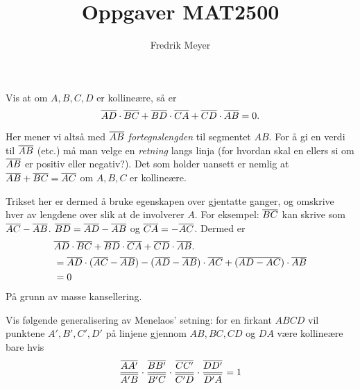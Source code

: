 \documentclass[11pt, norsk]{article}
\begin{document}
\title{Oppgaver MAT2500}
\author{Fredrik Meyer}
\maketitle 

\begin{oppg}
Vis at om $A,B,C,D$ er kollineære, så er 
\[
\overline{AD} \cdot \overline{BC}  + \overline{BD} \cdot \overline{CA} + \overline{CD} \cdot \overline{AB} = 0.
\]
\end{oppg}
\begin{losn}
 Her mener vi altså med $\overline{AB}$ \emph{fortegnslengden} til segmentet $AB$. For å gi en verdi til $\overline{AB}$ (etc.) må man velge en \emph{retning} langs linja (for hvordan skal en ellers si om $\overline{AB}$ er positiv eller negativ?). Det som holder uansett er nemlig at $\overline{AB} + \overline{BC} = \overline{AC}$ om $A,B,C$ er kollineære.

Trikset her er dermed å bruke egenskapen over gjentatte ganger, og omskrive hver av lengdene over slik at de involverer $A$. For eksempel: $\overline{BC}$ kan skrive som $\overline{AC}-\overline{AB}$. $\overline{BD} = \overline{AD}-\overline{AB}$ og $\overline{CA} = -\overline{AC}$. Dermed er
\begin{align*}
& \overline{AD} \cdot \overline{BC}  + \overline{BD} \cdot \overline{CA} + \overline{CD} \cdot \overline{AB}. \\
&= \overline{AD}\cdot (\overline{AC}-\overline{AB}) - (\overline{AD}-\overline{AB})\cdot \overline{AC} + (\overline{AD-AC}) \cdot \overline{AB} \\
&= 0
\end{align*}
På grunn av masse kansellering.
\end{losn}

\begin{oppg}
Vis følgende generalisering av Menelaos' setning: for en firkant $ABCD$ vil punktene $A',B',C',D'$ på linjene gjennom $AB, BC, CD$ og $DA$ være kollineære bare hvis 
$$
\frac{\overline{AA'}}{\overline{A'B}}\cdot \frac{\overline{BB'}}{\overline{B'C}} \cdot \frac{\overline{CC'}}{\overline{C'D}} \cdot \frac{\overline{DD'}}{\overline{D'A}} = 1
$$ 
\end{oppg}
\end{document}

